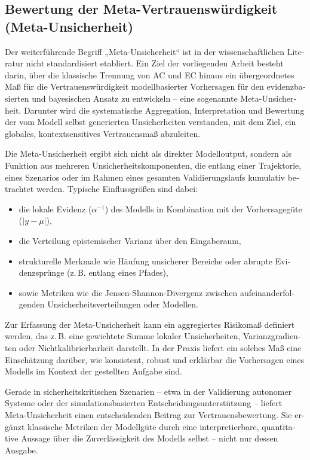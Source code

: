 \begin{otherlanguage}{ngerman}
\section{Bewertung der Meta-Vertrauenswürdigkeit (Meta-Unsicherheit)}

Der weiterführende Begriff „Meta-Unsicherheit“ ist in der wissenschaftlichen Literatur nicht standardisiert etabliert. Ein Ziel der vorliegenden Arbeit besteht darin, über die klassische Trennung von AC und EC hinaus ein übergeordnetes Maß für die Vertrauenswürdigkeit modellbasierter Vorhersagen für den evidenzbasierten und bayesischen Ansatz zu entwickeln – eine sogenannte Meta-Unsicherheit. Darunter wird die systematische Aggregation, Interpretation und Bewertung der vom Modell selbst generierten Unsicherheiten verstanden, mit dem Ziel, ein globales, kontextsensitives Vertrauensmaß abzuleiten. 

Die Meta-Unsicherheit ergibt sich nicht als direkter Modelloutput, sondern als Funktion aus mehreren Unsicherheitskomponenten, die entlang einer Trajektorie, eines Szenarios oder im Rahmen eines gesamten Validierungslaufs kumulativ betrachtet werden. Typische Einflussgrößen sind dabei:
\begin{itemize}
  \item die lokale Evidenz (\(\alpha^{-1}\)) des Modells in Kombination mit der Vorhersagegüte (\(\left| y - \mu \right|\)),
  \item die Verteilung epistemischer Varianz über den Eingaberaum,
  \item strukturelle Merkmale wie Häufung unsicherer Bereiche oder abrupte Evidenzsprünge (z.\,B. entlang eines Pfades),
  \item sowie Metriken wie die Jensen-Shannon-Divergenz zwischen aufeinanderfolgenden Unsicherheitsverteilungen oder Modellen.
\end{itemize}

Zur Erfassung der Meta-Unsicherheit kann ein aggregiertes Risikomaß definiert werden, das z.\,B. eine gewichtete Summe lokaler Unsicherheiten, Varianzgradienten oder Nichtkalibrierbarkeit darstellt. In der Praxis liefert ein solches Maß eine Einschätzung darüber, wie konsistent, robust und erklärbar die Vorhersagen eines Modells im Kontext der gestellten Aufgabe sind.

Gerade in sicherheitskritischen Szenarien – etwa in der Validierung autonomer Systeme oder der simulationsbasierten Entscheidungsunterstützung – liefert Meta-Unsicherheit einen entscheidenden Beitrag zur Vertrauensbewertung. Sie ergänzt klassische Metriken der Modellgüte durch eine interpretierbare, quantitative Aussage über die Zuverlässigkeit des Modells selbst – nicht nur dessen Ausgabe.

\end{otherlanguage}